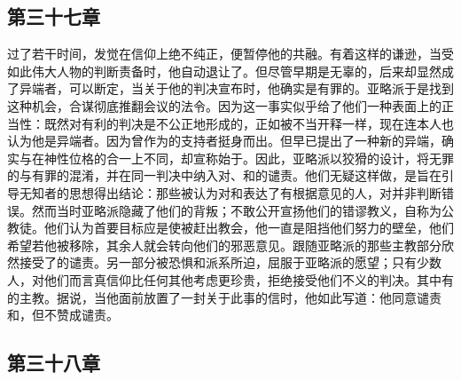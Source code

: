 
\subsection{第三十七章}

过了若干时间，发觉在信仰上绝不纯正，便暂停他的共融。有着这样的谦逊，当受如此伟大人物的判断责备时，他自动退让了。但尽管早期是无辜的，后来却显然成了异端者，可以断定，当关于他的判决宣布时，他确实是有罪的。亚略派于是找到这种机会，合谋彻底推翻会议的法令。因为这一事实似乎给了他们一种表面上的正当性：既然对有利的判决是不公正地形成的，正如被不当开释一样，现在连本人也认为他是异端者。因为曾作为的支持者挺身而出。但早已提出了一种新的异端，确实与在神性位格的合一上不同，却宣称始于。因此，亚略派以狡猾的设计，将无罪的与有罪的混淆，并在同一判决中纳入对、和的谴责。他们无疑这样做，是旨在引导无知者的思想得出结论：那些被认为对和表达了有根据意见的人，对并非判断错误。然而当时亚略派隐藏了他们的背叛；不敢公开宣扬他们的错谬教义，自称为公教徒。他们认为首要目标应是使被赶出教会，他一直是阻挡他们努力的壁垒，他们希望若他被移除，其余人就会转向他们的邪恶意见。跟随亚略派的那些主教部分欣然接受了的谴责。另一部分被恐惧和派系所迫，屈服于亚略派的愿望；只有少数人，对他们而言真信仰比任何其他考虑更珍贵，拒绝接受他们不义的判决。其中有的主教。据说，当他面前放置了一封关于此事的信时，他如此写道：他同意谴责和，但不赞成谴责。\par


\subsection{第三十八章}

